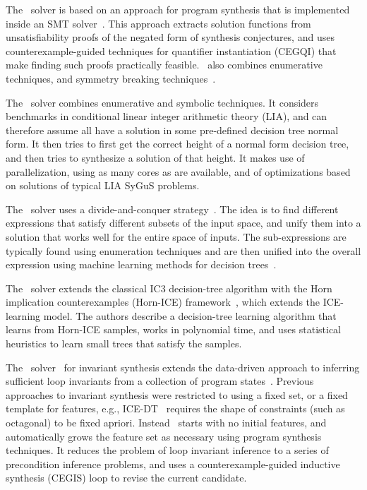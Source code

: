 The \cvcnew\ solver is based on an approach for program synthesis that is implemented inside an SMT solver~\cite{ReynoldsDKTB15}.
This approach extracts solution functions from unsatisfiability proofs of the negated form of synthesis conjectures,
and uses counterexample-guided techniques for quantifier instantiation (CEGQI) that make finding such proofs practically feasible.
\cvcnew\ also combines enumerative techniques, and symmetry breaking techniques~\cite{ReynoldsT17}. 

The \dryd\ solver combines enumerative and symbolic techniques.
It considers benchmarks in conditional linear integer arithmetic theory (LIA), and can therefore assume all have a solution in some pre-defined decision tree normal form.
It then tries to first get the correct height of a normal form decision tree, and then tries to synthesize a solution of that height.
It makes use of parallelization, using as many cores as are available, and of optimizations based on solutions of typical LIA SyGuS problems.

The \eusolvernew\ solver uses a divide-and-conquer strategy~\cite{AlurCAV15}.
The idea is to find different expressions that satisfy different subsets of the input space,
and unify them into a solution that works well for the entire space of inputs.
The sub-expressions are typically found using enumeration techniques
and are then unified into the overall expression using machine learning methods for decision trees~\cite{AlurRU17}.

The \horndini\ solver extends the classical IC3 decision-tree algorithm with
the Horn implication counterexamples (Horn-ICE) framework~\cite{EzudheenND0M18},
which extends the ICE-learning model.
The authors describe a decision-tree learning algorithm that learns from Horn-ICE samples,
works in polynomial time, and uses statistical heuristics to learn small trees that satisfy the samples.

The \lig\ solver~\cite{PadhiM17} for invariant synthesis extends the data-driven approach to inferring sufficient loop invariants from a collection of program states~\cite{PadhiSM16}.
Previous approaches to invariant synthesis were restricted to using a fixed set, or a fixed template for features,
e.g., ICE-DT~\cite{ICEDT,GNMR16} requires the shape of constraints (such as octagonal) to be fixed apriori.
Instead \lig\ starts with no initial features, and automatically grows the feature set as necessary using program synthesis techniques.
It reduces the problem of loop invariant inference to a series of precondition inference problems,
and uses a counterexample-guided inductive synthesis (CEGIS) loop to revise the current candidate.